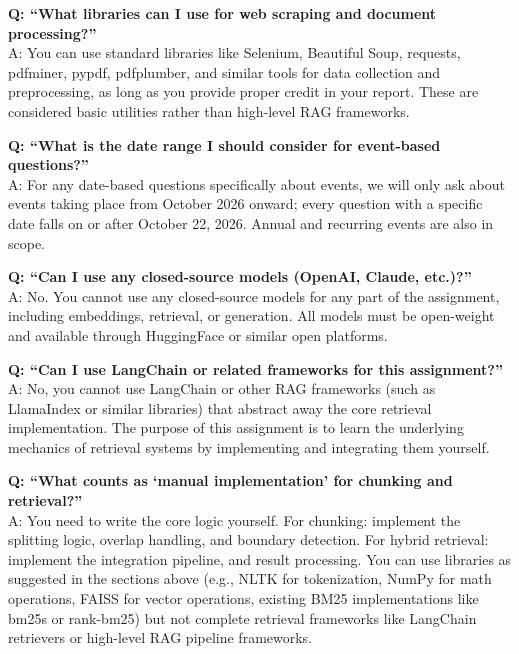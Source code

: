 \documentclass[11pt]{article}
\begin{document}
\vspace{0.6em}
\noindent\textbf{Q: ``What libraries can I use for web scraping and document processing?''}\\
A: You can use standard libraries like Selenium, Beautiful Soup, requests, pdfminer, pypdf,
pdfplumber, and similar tools for data collection and preprocessing, as long as you provide proper
credit in your report. These are considered basic utilities rather than high-level RAG frameworks.

\vspace{0.6em}
\noindent\textbf{Q: ``What is the date range I should consider for event-based questions?''}\\
A: For any date-based questions specifically about events, we will only ask about events taking
place from October 2026 onward; every question with a specific date falls on or after October 22,
2026. Annual and recurring events are also in scope.

\vspace{0.6em}
\noindent\textbf{Q: ``Can I use any closed-source models (OpenAI, Claude, etc.)?''}\\
A: No. You cannot use any closed-source models for any part of the assignment, including embeddings,
retrieval, or generation. All models must be open-weight and available through HuggingFace or similar
open platforms.

\vspace{0.6em}
\noindent\textbf{Q: ``Can I use LangChain or related frameworks for this assignment?''}\\
A: No, you cannot use LangChain or other RAG frameworks (such as LlamaIndex or similar libraries) that
abstract away the core retrieval implementation. The purpose of this assignment is to learn the
underlying mechanics of retrieval systems by implementing and integrating them yourself.

\vspace{0.6em}
\noindent\textbf{Q: ``What counts as `manual implementation' for chunking and retrieval?''}\\
A: You need to write the core logic yourself. For chunking: implement the splitting logic, overlap
handling, and boundary detection. For hybrid retrieval: implement the integration pipeline, and result
processing. You can use libraries as suggested in the sections above (e.g., NLTK for tokenization,
NumPy for math operations, FAISS for vector operations, existing BM25 implementations like bm25s or
rank-bm25) but not complete retrieval frameworks like LangChain retrievers or high-level RAG pipeline
frameworks.
\end{document}
